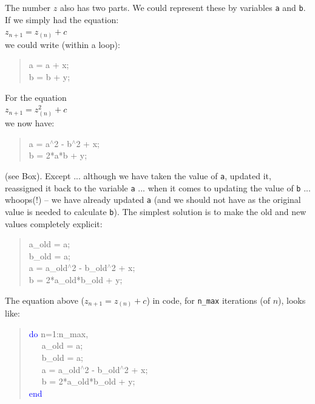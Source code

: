 \documentclass{tufte-book} %
\newenvironment{docspec}{\begin{quotation}\ttfamily\parskip0pt\parindent0pt\ignorespaces}{\end{quotation}}
\begin{document}
The number \(z\) also has two parts. We could represent these by variables \texttt{a} and \texttt{b}. If we simply had the equation:
\vspace{1mm}
\\\(z_{n+1} = z_{(n)}+c\)
\vspace{1mm}
\\\noindent we could write (within a loop):
\begin{docspec}
a = a + x;\\
b = b + y;
\end{docspec}

\vspace{8mm}
\pagebreak

\noindent For the equation
\vspace{1mm}
\\\(z_{n+1} = z^{2}_{(n)}+c\)
\vspace{1mm}
\\\noindent we now have:
\begin{docspec}
a = a\(^{\wedge}\)2 - b\(^{\wedge}\)2 + x;\\
b = 2*a*b + y;
\end{docspec}
(see Box). Except ... although we have taken the value of \texttt{a}, updated it, reassigned it back to the variable \texttt{a} ... when it comes to updating the value of \texttt{b} ... whoops(!) -- we have already updated \texttt{a} (and we should not have as the original value is needed to calculate \texttt{b}). The simplest solution is to make the old and new values completely explicit:
\begin{docspec}
a\_old = a;\\
b\_old = a;\\
a = a\_old\(^{\wedge}\)2 - b\_old\(^{\wedge}\)2 + x;\\
b = 2*a\_old*b\_old + y;
\end{docspec}

The equation above (\(z_{n+1} = z_{(n)}+c\)) in code, for \texttt{n\_max} iterations (of \(n\)), looks like:
\begin{docspec}
\textcolor{blue}{do} n=1:n\_max,\\
\ \ \ a\_old = a;\\
\ \ \ b\_old = a;\\
\ \ \ a = a\_old\(^{\wedge}\)2 - b\_old\(^{\wedge}\)2 + x;\\
\ \ \ b = 2*a\_old*b\_old + y;\\
\textcolor{blue}{end}
\end{docspec}
\end{document}
